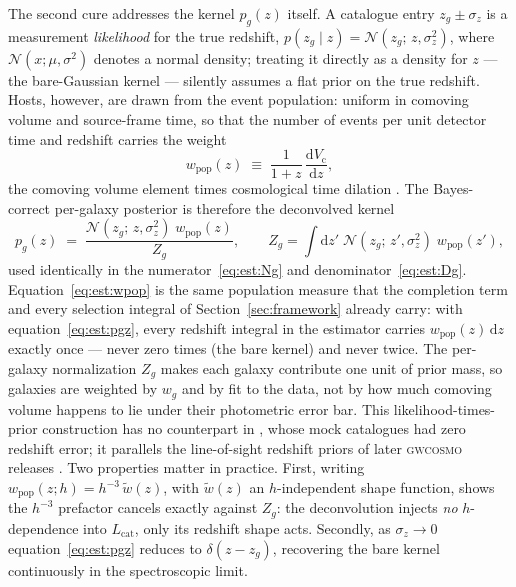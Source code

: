 The second cure addresses the kernel $p_g(z)$ itself. A catalogue entry $z_g \pm \sigma_z$ is a measurement \emph{likelihood} for the true redshift, $p(z_g \mid z) = \mathcal{N}(z_g;\, z, \sigma_z^2)$, where $\mathcal{N}(x; \mu, \sigma^2)$ denotes a normal density; treating it directly as a density for $z$ --- the bare-Gaussian kernel --- silently assumes a flat prior on the true redshift. Hosts, however, are drawn from the event population: uniform in comoving volume and source-frame time, so that the number of events per unit detector time and redshift carries the weight
\begin{equation}
  w_\mathrm{pop}(z) \;\equiv\; \frac{1}{1+z}\,\frac{\mathrm{d}V_\mathrm{c}}{\mathrm{d}z},
  \label{eq:est:wpop}
\end{equation}
the comoving volume element \citep{Hogg:1999ad} times cosmological time dilation \citep{Babak:2017tow,Mandel:2018mve}. The Bayes-correct per-galaxy posterior is therefore the deconvolved kernel
\begin{equation}
  p_g(z) \;=\; \frac{\mathcal{N}(z_g;\, z, \sigma_z^2)\; w_\mathrm{pop}(z)}{Z_g},
  \qquad
  Z_g = \int \mathrm{d}z'\; \mathcal{N}(z_g;\, z', \sigma_z^2)\; w_\mathrm{pop}(z'),
  \label{eq:est:pgz}
\end{equation}
used identically in the numerator~\eqref{eq:est:Ng} and denominator~\eqref{eq:est:Dg}. Equation~\eqref{eq:est:wpop} is the same population measure that the completion term and every selection integral of Section~\ref{sec:framework} already carry: with equation~\eqref{eq:est:pgz}, every redshift integral in the estimator carries $w_\mathrm{pop}(z)\,\mathrm{d}z$ exactly once --- never zero times (the bare kernel) and never twice. The per-galaxy normalization $Z_g$ makes each galaxy contribute one unit of prior mass, so galaxies are weighted by $w_g$ and by fit to the data, not by how much comoving volume happens to lie under their photometric error bar. This likelihood-times-prior construction has no counterpart in \citet{Gray:2019ksv}, whose mock catalogues had zero redshift error; it parallels the line-of-sight redshift priors of later \textsc{gwcosmo} releases \citep{Gray:2023wgj}.
Two properties matter in practice. First, writing $w_\mathrm{pop}(z; h) = h^{-3}\, \tilde{w}(z)$, with $\tilde{w}(z)$ an $h$-independent shape function, shows the $h^{-3}$ prefactor cancels exactly against $Z_g$: the deconvolution injects \emph{no} $h$-dependence into $L_\mathrm{cat}$, only its redshift shape acts. Secondly, as $\sigma_z \to 0$ equation~\eqref{eq:est:pgz} reduces to $\delta(z - z_g)$, recovering the bare kernel continuously in the spectroscopic limit. %

